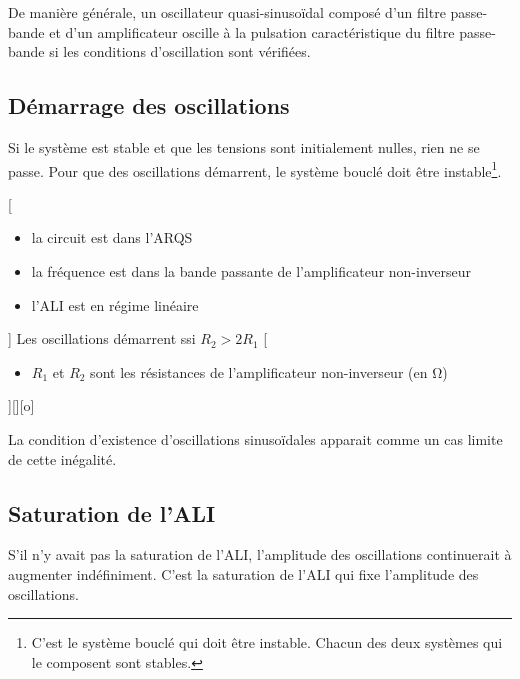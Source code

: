 De manière générale, un oscillateur quasi-sinusoïdal composé d'un filtre passe-bande et d'un amplificateur oscille à la pulsation caractéristique du filtre passe-bande si les conditions d'oscillation sont vérifiées.


\subsection{Démarrage des oscillations}

Si le système est stable et que les tensions sont initialement nulles, rien ne se passe. Pour que des oscillations démarrent, le système bouclé doit être instable\footnote{C'est le système bouclé qui doit être instable. Chacun des deux systèmes qui le composent sont stables.}.

[
  \begin{itemize}
    \item la circuit est dans l'ARQS
    \item la fréquence est dans la bande passante de l'amplificateur non-inverseur
    \item l'ALI est en régime linéaire
  \end{itemize}
]
{Les oscillations démarrent ssi $R_2>2R_1$}
[
  \begin{itemize}
    \item $R_1$ et $R_2$ sont les résistances de l'amplificateur non-inverseur (en \unit{\ohm})
  \end{itemize}
][][o]

La condition d'existence d'oscillations sinusoïdales apparait comme un cas limite de cette inégalité.

\subsection{Saturation de l'ALI}

S'il n'y avait pas la saturation de l'ALI, l'amplitude des oscillations continuerait à augmenter indéfiniment. C'est la saturation de l'ALI qui fixe l'amplitude des oscillations.

